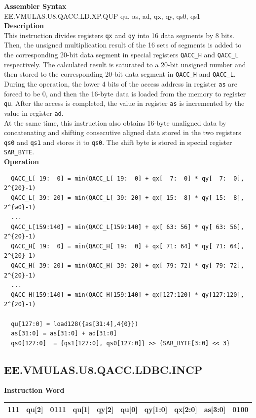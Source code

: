 \textbf{Assembler Syntax} \\
EE.VMULAS.U8.QACC.LD.XP.QUP qu, as, ad, qx, qy, qs0, qs1 \\
\textbf{Description} \\
This instruction divides registers \lstinline{qx} and \lstinline{qy} into 16 data segments by 8 bits. Then, the unsigned multiplication result of the 16 sets of segments is added to the corresponding 20-bit data segment in special registers \lstinline{QACC_H} and \lstinline{QACC_L} respectively. The calculated result is saturated to a 20-bit unsigned number and then stored to the corresponding 20-bit data segment in \lstinline{QACC_H} and \lstinline{QACC_L}.\\
During the operation, the lower 4 bits of the access address in register \lstinline{as} are forced to be 0, and then the 16-byte data is loaded from the memory to register \lstinline{qu}. After the access is completed, the value in register \lstinline{as} is incremented by the value in register \lstinline{ad}.\\
At the same time, this instruction also obtains 16-byte unaligned data by concatenating and shifting consecutive aligned data stored in the two registers \lstinline{qs0} and \lstinline{qs1} and stores it to \lstinline{qs0}. The shift byte is stored in special register \lstinline{SAR_BYTE}.\\
\textbf{Operation}
\begin{lstlisting}
  QACC_L[ 19:  0] = min(QACC_L[ 19:  0] + qx[  7:  0] * qy[  7:  0], 2^{20}-1)
  QACC_L[ 39: 20] = min(QACC_L[ 39: 20] + qx[ 15:  8] * qy[ 15:  8], 2^{w0}-1)
  ...
  QACC_L[159:140] = min(QACC_L[159:140] + qx[ 63: 56] * qy[ 63: 56], 2^{20}-1)
  QACC_H[ 19:  0] = min(QACC_H[ 19:  0] + qx[ 71: 64] * qy[ 71: 64], 2^{20}-1)
  QACC_H[ 39: 20] = min(QACC_H[ 39: 20] + qx[ 79: 72] * qy[ 79: 72], 2^{20}-1)
  ...
  QACC_H[159:140] = min(QACC_H[159:140] + qx[127:120] * qy[127:120], 2^{20}-1)

  qu[127:0] = load128({as[31:4],4{0}})
  as[31:0] = as[31:0] + ad[31:0]
  qs0[127:0]  = {qs1[127:0], qs0[127:0]} >> {SAR_BYTE[3:0] << 3}
\end{lstlisting}

\clearpage
\subsection{EE.VMULAS.U8.QACC.LDBC.INCP}\label{instruction:EEVMULASU8QACCLDBCINCP}
\setlength\tabcolsep{6pt}
\textbf{Instruction Word} \\
\begin{tabular}{|c|c|c|c|c|c|c|c|c|c|}
	\hline
	111 & qu[2] & 0111 & qu[1] & qy[2] & qu[0] & qy[1:0] & qx[2:0] & as[3:0] & 0100 \\
	\hline
\end{tabular}

